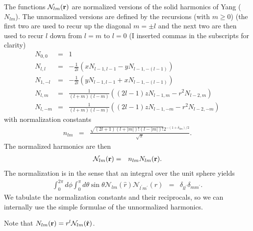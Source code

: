 \documentclass[12pt]{article}
\newcommand{\N}{\mathcal{N}}
\newcommand{\rv}{\vb{r}}
\newcommand{\rhat}{\hat{\rv}}
\begin{document}
The functions $\N_{lm}(\vb{r})$ are normalized versions of the solid harmonics of Yang ($N_{lm}$).  The unnormalized versions are defined by the recursions (with $m\ge 0$) (the first two are used to recur up the diagonal $m=\pm l$ and the next two are then used to recur $l$ down from $l=m$ to $l=0$ (I inserted commas in the subscripts for clarity)
\begin{eqnarray}
  N_{0,0} & = & 1 \\
  N_{l, l} & = & -\frac{1}{2 l} \left(x N_{l-1,l-1} - y N_{l - 1, -(l - 1)}\right) \\
  N_{1,-l} & = & -\frac{1}{2 l} \left(y N_{l-1,l-1} + x N_{l - 1, -(l - 1)}\right) \\ 
  N_{l, m} & = & \frac{1}{(l+m) (l-m)} \left((2 l-1) z N_{l-1, m}-r^2  N_{l-2, m} \right) \\
  N_{l, -m}& = & \frac{1}{(l+m) (l-m)} \left((2 l-1) z N_{l-1, -m}-r^2 N_{l-2, -m} \right) 
\end{eqnarray}
with normalization constants
\begin{eqnarray}
  n_{lm} & = & \frac{\sqrt{(2 l +1) \left(l +{| m |}\right)! \left(l -{| m |}\right)!}  2^{-(1 + \delta_{0 m})/2}}{\sqrt{\pi}} .
\end{eqnarray}
The normalized harmonics are then
\begin{eqnarray}
  \N_{lm}(\vb{r}) & = & n_{lm} N_{lm}(\vb{r}).
\end{eqnarray}
The normalization is in the sense that an integral over the unit sphere yields
\begin{eqnarray}
  \int_0^{2 \pi} d\phi \int_0^\pi d\theta \sin \theta  \N_{lm} (\hat{r}) \N_{l^\prime m^\prime}(\hat{r})  & = & \delta_{l l^\prime} \delta_{m m^\prime} .
\end{eqnarray}
We tabulate the normalization constants and their reciprocals, so we can internally use the simple formulae of the unnormalized harmonics.

Note that $N_{lm}(\rv) = r^l \N_{lm}(\rhat)$.
\end{document}
